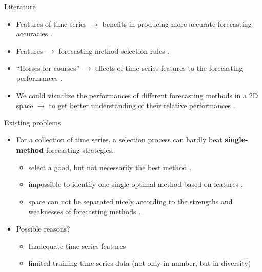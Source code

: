 \documentclass[11pt,ignorenonframetext,compress]{beamer}
\providecommand{\tightlist}{%
  \setlength{\itemsep}{0pt}\setlength{\parskip}{0pt}}
\begin{document}
\begin{frame}{Literature}

  \begin{itemize}
  \item
    Features of time series \(\rightarrow\) benefits in producing more
    accurate forecasting accuracies \citep{adam1973individual}.

  \item Features \(\rightarrow\) forecasting method selection rules
    \citep{meade2000evidence}.

  \item
    ``Horses for courses'' \(\rightarrow\) effects of time series features
    to the forecasting performances \citep{Petropoulos2014}.

  \item We could visualize the performances of different forecasting methods in a 2D space
    \(\rightarrow\) to get better understanding of their relative performances
    \citep{kang2017visualising}.

  \end{itemize}

\end{frame}

\begin{frame}{Existing problems}

  \begin{itemize}
    \tightlist
  \item For a collection of time series, a selection process can hardly beat
    \textbf{single-method} forecasting strategies.

    \begin{itemize}
      \tightlist
    \item
      select a good, but not necessarily the best method \citep{meade2000evidence}.
    \item
      impossible to identify one single optimal method based on features
      \citep{Petropoulos2014}.
    \item
      space can not be separated nicely according to the strengths and
      weaknesses of forecasting methods \citep{kang2017visualising}.
    \end{itemize}

\item Possible reasons?

  \begin{itemize}
  \item
    Inadequate time series features
  \item
    limited training time series data (not only in number, but in
    diversity)
  \end{itemize}
\end{itemize}
\end{frame}
\end{document}
